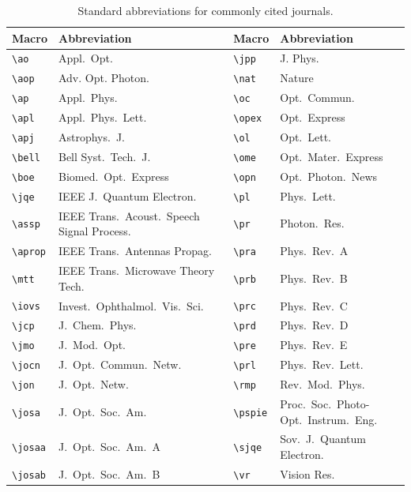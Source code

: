 \documentclass[10pt,letterpaper]{article}
\begin{document}
\begin{table}[htbp]
\centering\caption{Standard abbreviations
 for commonly cited journals.}
\begin{tabular}{lp{1.7in}|lp{1.7in}}
\hline
Macro        & Abbreviation                & Macro        & Abbreviation          \\ \hline
\verb+\ao+   & Appl.\  Opt.\               & \verb+\jpp+  & J. Phys.              \\
\verb+\aop+  & Adv. Opt. Photon.           & \verb+\nat+  & Nature                \\
\verb+\ap+   & Appl.\  Phys.\              & \verb+\oc+   & Opt.\ Commun.\        \\
\verb+\apl+  & Appl.\ Phys.\ Lett.\        & \verb+\opex+ & Opt.\ Express         \\
\verb+\apj+  & Astrophys.\ J.\             & \verb+\ol+   & Opt.\ Lett.\          \\
\verb+\bell+ & Bell Syst.\ Tech.\ J.\      & \verb+\ome+  & Opt.\ Mater.\ Express \\
\verb+\boe+  & Biomed.\ Opt.\ Express      & \verb+\opn+  & Opt.\ Photon.\ News   \\
\verb+\jqe+ & IEEE J.\ Quantum Electron.\  & \verb+\pl+   & Phys.\ Lett.\         \\
\verb+\assp+ & IEEE Trans.\ Acoust.\ Speech Signal Process.\  & \verb+\pr+ & Photon.\ Res.\ \\
\verb+\aprop+ & IEEE Trans.\  Antennas Propag.\    & \verb+\pra+ & Phys.\ Rev.\ A   \\
\verb+\mtt+ & IEEE Trans.\ Microwave Theory Tech.\ & \verb+\prb+ & Phys.\ Rev.\ B   \\
\verb+\iovs+ & Invest.\ Ophthalmol.\ Vis.\ Sci.\    & \verb+\prc+ & Phys.\ Rev.\ C   \\
\verb+\jcp+ & J.\ Chem.\ Phys.\            & \verb+\prd+ & Phys.\ Rev.\ D   \\
\verb+\jmo+ & J.\ Mod.\ Opt.\              & \verb+\pre+ & Phys.\ Rev.\ E   \\
\verb+\jocn+ & J.\ Opt.\ Commun.\ Netw.\   & \verb+\prl+ & Phys.\ Rev.\ Lett.\    \\
\verb+\jon+ & J.\ Opt.\ Netw.\             & \verb+\rmp+ & Rev.\ Mod.\ Phys.\    \\
\verb+\josa+ & J.\ Opt.\ Soc.\ Am.\        & \verb+\pspie+ & Proc.\ Soc.\ Photo-Opt.\ Instrum.\ Eng.\   \\
\verb+\josaa+ & J.\ Opt.\ Soc.\ Am.\ A     & \verb+\sjqe+ & Sov.\ J.\ Quantum Electron.\   \\
\verb+\josab+ & J.\ Opt.\ Soc.\ Am.\ B     & \verb+\vr+ & Vision Res.\   \\ \hline
\end{tabular}
\end{table}
\end{document}
